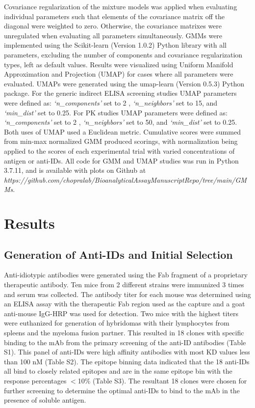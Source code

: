 Covariance regularization of the mixture models was applied when evaluating individual parameters such that elements of the covariance matrix off the diagonal were weighted to zero.  Otherwise, the covariance matrixes were unregulated when evaluating all parameters simultaneously.  GMMs were implemented using the Scikit-learn (Version 1.0.2) Python library with all parameters, excluding the number of components and covariance regularization types, left as default values.  Results were visualized using Uniform Manifold Approximation and Projection (UMAP) for cases where all parameters were evaluated.  UMAPs were generated using the umap-learn (Version 0.5.3) Python package.  For the generic indirect ELISA screening studies UMAP parameters were defined as: \emph{‘n{\_}components’} set to 2 , \emph{‘n{\_}neighbors’} set to 15, and \emph{‘min{\_}dist’} set to 0.25.  For PK studies UMAP parameters were defined as: \emph{‘n{\_}components’} set to 2 , \emph{‘n{\_}neighbors’} set to 50, and \emph{‘min{\_}dist’} set to 0.25.  Both uses of UMAP used a Euclidean metric. Cumulative scores were summed from min-max normalized GMM produced scorings, with normalization being applied to the scores of each experimental trial with varied concentrations of antigen or anti-IDs.  All code for GMM and UMAP studies was run in Python 3.7.11, and is available with plots on Github at \emph{https://github.com/chopralab/Bioanalytical\textunderscore Assay\textunderscore Manuscript\textunderscore Repo/tree/main/GMMs}.


\section{Results}
\subsection{Generation of Anti-IDs and Initial Selection}
Anti-idiotypic antibodies were generated using the Fab fragment of a proprietary therapeutic antibody.  Ten mice from 2 different strains were immunized 3 times and serum was collected.  The antibody titer for each mouse was determined using an ELISA assay with the therapeutic Fab region used as the capture and a goat anti-mouse IgG-HRP was used for detection.  Two mice with the highest titers were euthanized for generation of hybridomas with their lymphocytes from spleens and the myeloma fusion partner.  This resulted in 18 clones with specific binding to the mAb from the primary screening of the anti-ID antibodies (Table S1).  This panel of anti-IDs were high affinity antibodies with most KD values less than 100 nM (Table S2).    The epitope binning data indicated that the 18 anti-IDs all bind to closely related epitopes and are in the same epitope bin with the response percentages $<$10\% (Table S3).  The resultant 18 clones were chosen for further screening to determine the optimal anti-IDs to bind to the mAb in the presence of soluble antigen.

